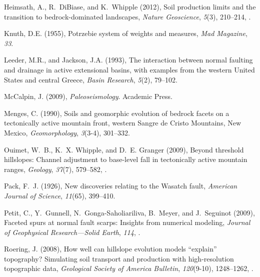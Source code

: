 \begin{thebibliography}{41}
Heimsath, A., R.~DiBiase, and K.~Whipple (2012), Soil production limits and the
  transition to bedrock-dominated landscapes, \textit{Nature Geoscience},
  \textit{5}(3), 210--214, .

Knuth, D.E. (1955), Potrzebie system of weights and measures,
  \textit{Mad Magazine}, \textit{33}.

Leeder, M.R., and Jackson, J.A. (1993), {The interaction between normal faulting and drainage in active extensional basins, with examples from the western United States and central Greece}, \textit{Basin Research}, \textit{5}(2), 79--102.

McCalpin, J. (2009), \textit{Paleoseismology}. Academic Press.

Menges, C. (1990), {Soils and geomorphic evolution of bedrock facets on a
  tectonically active mountain front, western Sangre de Cristo Mountains, New
  Mexico}, \textit{Geomorphology}, \textit{3}(3-4), 301--332.

Ouimet, W.~B., K.~X. Whipple, and D.~E. Granger (2009), Beyond threshold
  hillslopes: Channel adjustment to base-level fall in tectonically active
  mountain ranges, \textit{Geology}, \textit{37}(7), 579--582,
  .

Pack, F.~J. (1926), {New discoveries relating to the Wasatch fault},
  \textit{American Journal of Science}, \textit{11}(65), 399--410.

Petit, C., Y.~Gunnell, N.~Gonga-Saholiariliva, B.~Meyer, and J.~Seguinot
  ({2009}), {Faceted spurs at normal fault scarps: Insights from numerical
  modeling}, \textit{Journal of Geophysical Research---Solid Earth},
  \textit{{114}}, .

Roering, J. (2008), {How well can hillslope evolution models ``explain''
  topography? Simulating soil transport and production with high-resolution
  topographic data}, \textit{Geological Society of America Bulletin},
  \textit{120}(9-10), 1248--1262, .


\end{thebibliography}
